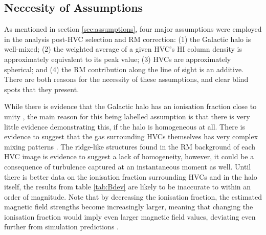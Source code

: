 \subsection{Neccesity of Assumptions}
\label{ssec:B2}

As mentioned in section \ref{sec:assumptions}, four major assumptions were employed in the analysis post-HVC selection and RM correction: (1) the Galactic halo is well-mixed; (2) the weighted average of a given HVC's HI column density is approximately equivalent to its peak value; (3) HVCs are approximately spherical; and (4) the RM contribution along the line of sight is an additive. There are both reasons for the necessity of these assumptions, and clear blind spots that they present.


While there is evidence that the Galactic halo has an ionisation fraction close to unity \citep{ID23}, the main reason for this being labelled assumption is that there is very little evidence demonstrating this, if the halo is homogeneous at all. There is evidence to suggest that the gas surrounding HVCs themselves has very complex mixing patterns \cite{ID69, ID4}. The ridge-like structures found in the RM background of each HVC image is evidence to suggest a lack of homogeneity, however, it could be a consequence of turbulence captured at an instantaneous moment as well. Until there is better data on the ionisation fraction surrounding HVCs and in the halo itself, the results from table \ref{tab:Bdev} are likely to be inaccurate to within an order of magnitude. Note that by decreasing the ionisation fraction, the estimated magnetic field strengths become increasingly larger, meaning that changing the ionisation fraction would imply even larger magnetic field values, deviating even further from simulation predictions \citep{ID24}.


